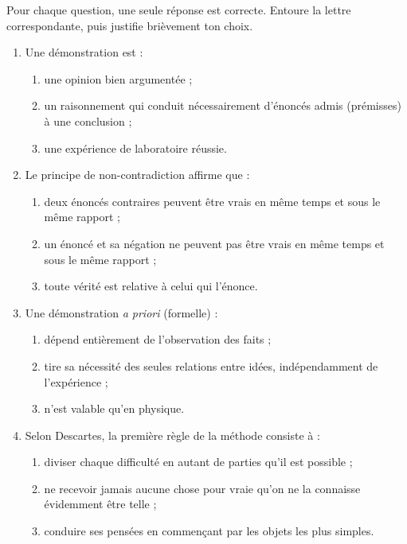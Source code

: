 \documentclass[11pt]{article}
\begin{document}
\begin{exercice}
Pour chaque question, une seule réponse est correcte. Entoure la lettre correspondante, puis justifie brièvement ton choix.
\begin{enumerate}
\item Une démonstration est :
\begin{enumerate}
\item une opinion bien argumentée ;
\item un raisonnement qui conduit nécessairement d'énoncés admis (prémisses) à une conclusion ;
\item une expérience de laboratoire réussie.
\end{enumerate}
\item Le principe de non-contradiction affirme que :
\begin{enumerate}
\item deux énoncés contraires peuvent être vrais en même temps et sous le même rapport ;
\item un énoncé et sa négation ne peuvent pas être vrais en même temps et sous le même rapport ;
\item toute vérité est relative à celui qui l'énonce.
\end{enumerate}
\item Une démonstration \emph{a priori} (formelle) :
\begin{enumerate}
\item dépend entièrement de l'observation des faits ;
\item tire sa nécessité des seules relations entre idées, indépendamment de l'expérience ;
\item n'est valable qu'en physique.
\end{enumerate}
\item Selon Descartes, la première règle de la méthode consiste à :
\begin{enumerate}
\item diviser chaque difficulté en autant de parties qu'il est possible ;
\item ne recevoir jamais aucune chose pour vraie qu'on ne la connaisse évidemment être telle ;
\item conduire ses pensées en commençant par les objets les plus simples.
\end{enumerate}
\end{enumerate}
\end{exercice}
\end{document}
